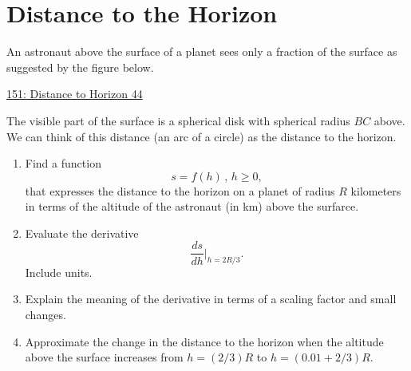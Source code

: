 \documentclass{ximera}
\begin{document}
\section{Distance to the Horizon}
\begin{example} \label{ExKdfdKREGER}
An astronaut above the surface of a planet sees only a fraction of the surface as suggested by the figure below.

\begin{onlineOnly}
    \begin{center}
\end{center}
\end{onlineOnly}

\href{https://www.desmos.com/calculator/8shf1msp4m}{151: Distance to Horizon 44}

The visible part of the surface is a spherical disk with spherical radius $BC$ above. We can think of this distance (an arc of a circle) as the distance to the horizon.

\begin{enumerate}
\item Find a function 
\[
   s = f(h) \, , \, h\geq 0,
\]
that expresses the distance to the horizon on a planet of radius $R$ kilometers in terms of the altitude of the astronaut (in km) above the surfarce.

\item Evaluate the derivative
\[
      \frac{ds}{dh} \Big|_{h=2R/3} .
\]
Include units.

\item Explain the meaning of the derivative in terms of a scaling factor and small changes.

\item Approximate the change in the distance to the horizon when the altitude above the surface increases from $h=(2/3)R$ to $h=(0.01 + 2/3)R$.
\end{enumerate}
\end{example}
\end{document}
